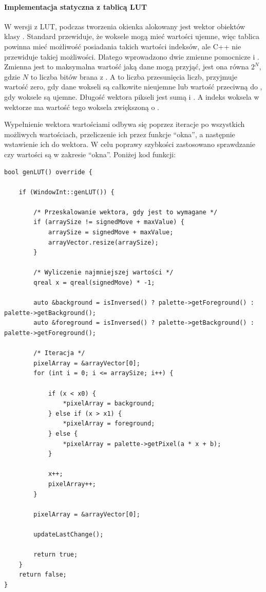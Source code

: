 \paragraph{Implementacja statyczna z tablicą LUT}
\par
W wersji z LUT, podczas tworzenia okienka alokowany jest wektor obiektów  klasy .
Standard \DICOM przewiduje, że woksele mogą mieć wartości ujemne, więc tablica powinna mieć możliwość posiadania takich wartości indeksów, ale C++ nie przewiduje takiej możliwości.
Dlatego wprowadzono dwie zmienne pomocnicze  i .
Zmienna  jest to maksymalna wartość jaką dane mogą przyjąć, jest ona równa $2^N$, gdzie $N$ to liczba bitów brana z .
A  to liczba przesunięcia liczb, przyjmuje wartość zero, gdy dane wokseli są całkowite nieujemne lub wartość przeciwną do , gdy woksele są ujemne.
Długość wektora pikseli jest sumą  i .
A indeks woksela w wektorze ma wartość tego woksela zwiększoną o .
\par
Wypełnienie wektora wartościami odbywa się poprzez iteracje po wszystkich możliwych wartościach, przeliczenie ich przez funkcje \enquote{okna}, a następnie wstawienie ich do wektora.
W celu poprawy szybkości zastosowano sprawdzanie czy wartości są w zakresie \enquote{okna}.
Poniżej kod funkcji:
\begin{lstlisting}
bool genLUT() override {

    if (WindowInt::genLUT()) {

        /* Przeskalowanie wektora, gdy jest to wymagane */
        if (arraySize != signedMove + maxValue) {
            arraySize = signedMove + maxValue;
            arrayVector.resize(arraySize);
        }

        /* Wyliczenie najmniejszej wartości */
        qreal x = qreal(signedMove) * -1;

        auto &background = isInversed() ? palette->getForeground() : palette->getBackground();
        auto &foreground = isInversed() ? palette->getBackground() : palette->getForeground();

        /* Iteracja */
        pixelArray = &arrayVector[0];
        for (int i = 0; i <= arraySize; i++) {

            if (x < x0) {
                *pixelArray = background;
            } else if (x > x1) {
                *pixelArray = foreground;
            } else {
                *pixelArray = palette->getPixel(a * x + b);
            }

            x++;
            pixelArray++;
        }

        pixelArray = &arrayVector[0];

        updateLastChange();

        return true;
    }
    return false;
}
\end{lstlisting}


